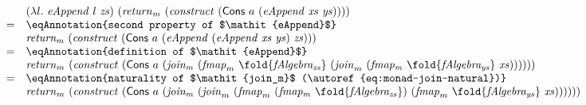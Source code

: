 \begin{proof*}
\begin{displaymath}
\begin{array}{cl}
      & (\lambda l.~\mathit{eAppend}~l~\mathit{zs})~(\mathit{return}_m~(\mathit{construct}~(\mathsf{Cons}~a~(\mathit{eAppend}~\mathit{xs}~\mathit{ys})))) \\
      =&\eqAnnotation{second property of $\mathit{eAppend}$} \\
      & \mathit{return_m}~(\mathit{construct}~(\mathsf{Cons}~a~(\mathit{eAppend}~(\mathit{eAppend}~\mathit{xs}~\mathit{ys})~\mathit{zs}))) \\
      =&\eqAnnotation{definition of $\mathit{eAppend}$} \\
      &\mathit{return}_m~(\mathit{construct}~(\mathsf{Cons}~a~(\mathit{join_m}~(\mathit{fmap}_m~\fold{\mathit{fAlgebra_{zs}}}~(\mathit{join}_m~(\mathit{fmap_m}~\fold{\mathit{fAlgebra_{ys}}}~\mathit{xs})))))) \\
      =&\eqAnnotation{naturality of $\mathit{join_m}$ (\autoref{eq:monad-join-natural})} \\
      &\mathit{return}_m~(\mathit{construct}~(\mathsf{Cons}~a~(\mathit{join_m}~(\mathit{join}_m~(\mathit{fmap}_m~(\mathit{fmap_m}~\fold{\mathit{fAlgebra_{zs}}})~(\mathit{fmap}_m~\fold{\mathit{fAlgebra_{ys}}}~\mathit{xs})))))) \\

\end{array}
\end{displaymath}
\end{proof*}
